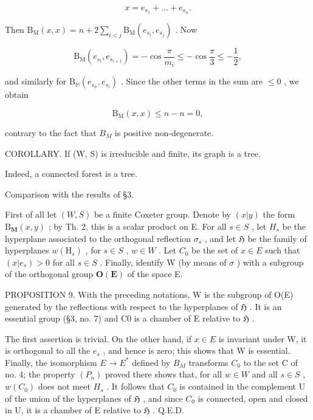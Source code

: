\[
x = e _ {s _ {1}} + \dots + e _ {s _ {n}}.
\]

Then \(\mathrm{B_M}(x,x) = n + 2\sum_{i < j}\mathrm{B_M}(e_{s_i},e_{s_j})\) . Now

\[
\mathrm{B} _ {\mathrm{M}} (e _ {s _ {i}}, e _ {s _ {i + 1}}) = - \cos \frac {\pi}{m _ {i}} \leqslant - \cos \frac {\pi}{3} \leqslant - \frac {1}{2},
\]

and similarly for \(\mathrm{B}_{\mathbb{M}}(e_{s_n}, e_{s_i})\) . Since the other terms in the sum are \(\leqslant 0\) , we obtain

\[
\mathrm{B} _ {\mathrm{M}} (x, x) \leqslant n - n = 0,
\]

contrary to the fact that \(B_{M}\) is positive non-degenerate.

COROLLARY. If (W, S) is irreducible and finite, its graph is a tree.

Indeed, a connected forest is a tree.

Comparison with the results of §3.

First of all let \((W,S)\) be a finite Coxeter group. Denote by \((x|y)\) the form \(\mathrm{B}_{\mathbf{M}}(x,y)\) ; by Th. 2, this is a scalar product on E. For all \(s \in S\) , let \(H_{s}\) be the hyperplane associated to the orthogonal reflection \(\sigma_{s}\) , and let \(\mathfrak{H}\) be the family of hyperplanes \(w(\mathrm{H}_{s})\) , for \(s \in S\) , \(w \in W\) . Let \(C_{0}\) be the set of \(x \in E\) such that \((x|e_{s}) > 0\) for all \(s \in S\) . Finally, identify W (by means of \(\sigma\) ) with a subgroup of the orthogonal group \(\mathbf{O}(\mathbf{E})\) of the space E.

PROPOSITION 9. With the preceding notations, W is the subgroup of O(E) generated by the reflections with respect to the hyperplanes of \(\mathfrak{H}\) . It is an essential group (§3, no. 7) and C0 is a chamber of E relative to \(\mathfrak{H}\) .

The first assertion is trivial. On the other hand, if \(x \in E\) is invariant under W, it is orthogonal to all the \(e_{s}\) , and hence is zero; this shows that W is essential. Finally, the isomorphism \(E \to E^{*}\) defined by \(B_{M}\) transforms \(C_{0}\) to the set C of no. 4; the property \((P_{n})\) proved there shows that, for all \(w \in W\) and all \(s \in S\) , \(w(C_0)\) does not meet \(H_s\) . It follows that \(C_0\) is contained in the complement U of the union of the hyperplanes of \(\mathfrak{H}\) , and since \(C_0\) is connected, open and closed in U, it is a chamber of E relative to \(\mathfrak{H}\) . Q.E.D.

